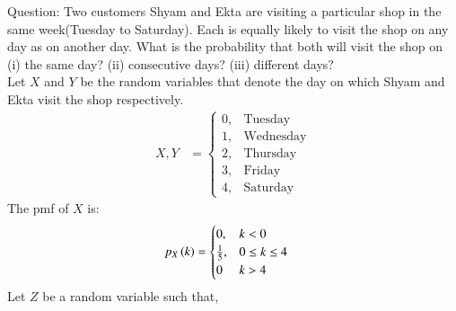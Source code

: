 \documentclass[journal,12pt,onecolumn]{IEEEtran}
\theoremstyle{remark}
\begin{document}
%
Question:
Two customers Shyam and Ekta are visiting a particular shop in the same week(Tuesday to Saturday). Each is equally likely to visit the shop on any day as on another day. What is the probability that both will visit the shop on (i) the same day? (ii) consecutive days? (iii) different days?
\\
\solution
Let $X$ and $Y$ be the random variables that denote the day on which Shyam and Ekta visit the shop respectively.
\begin{align}
X,Y &= 
	\begin{cases}
		0, & \text{Tuesday}\\
		1, & \text{Wednesday}\\
		2, & \text{Thursday}\\
		3, & \text{Friday}\\
		4, & \text{Saturday}
	\end{cases}
\end{align}
The pmf of $X$	 is:
\begin{align}
	p_X\left(k\right) &=
	\begin{cases}
		0, & k < 0\\
		\frac{1}{5}, & 0 \leq k \leq 4\\
		0 & k > 4
	\end{cases}
\end{align}
Let $Z$ be a random variable such that,
\end{document}
